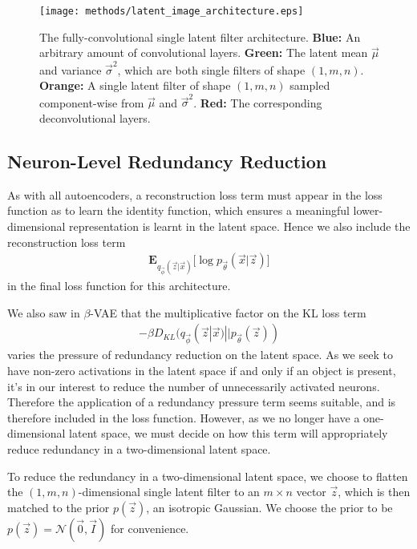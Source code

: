 \begin{figure}[H]
\centering
\captionsetup{justification=centering}
\texttt{[image: methods/latent\_image\_architecture.eps]}
\caption{The fully-convolutional single latent filter architecture. \textbf{Blue:} An arbitrary amount of convolutional layers. \textbf{Green:} The latent mean $\vec{\mu}$ and variance $\vec{\sigma}^2$, which are both single filters of shape $(1, m, n)$. \textbf{Orange:} A single latent filter of shape $(1, m, n)$ sampled component-wise from $\vec{\mu}$ and $\vec{\sigma}^2$. \textbf{Red:} The corresponding deconvolutional layers.}
\label{fig:latent_image_architecture}
\end{figure}

%
%
\subsection{Neuron-Level Redundancy Reduction}
As with all autoencoders, a reconstruction loss term must appear in the loss function as to learn the identity function, which ensures a meaningful lower-dimensional representation is learnt in the latent space. Hence we also include the reconstruction loss term 
\begin{align}
\mathbf{E}_{q_{\vec{\phi}}(\vec{z}|\vec{x})}\big[\log p_{\vec{\theta}}(\vec{x} | \vec{z}) \big]
\end{align}
in the final loss function for this architecture.

We also saw in $\beta$-VAE that the multiplicative factor on the KL loss term 
\begin{align}
-\beta D_{KL}(q_{\vec{\phi}}(\vec{z}|\vec{x}) || p_{\vec{\theta}}(\vec{z}))
\end{align}
varies the pressure of redundancy reduction on the latent space. As we seek to have non-zero activations in the latent space if and only if an object is present, it's in our interest to reduce the number of unnecessarily activated neurons. Therefore the application of a redundancy pressure term seems suitable, and is therefore included in the loss function. However, as we no longer have a one-dimensional latent space, we must decide on how this term will appropriately reduce redundancy in a two-dimensional latent space.

To reduce the redundancy in a two-dimensional latent space, we choose to flatten the $(1, m, n)$-dimensional single latent filter to an $m \times n$ vector $\vec{z}$, which is then matched to the prior $p(\vec{z})$, an isotropic Gaussian. We choose the prior to be $p(\vec{z}) = \mathcal{N}(\vec{0}, \vec{I})$ for convenience.\\

